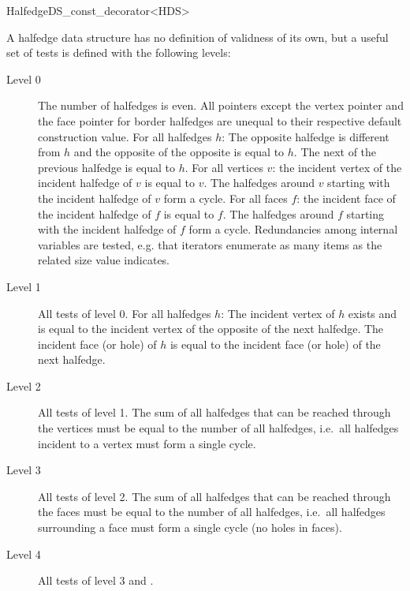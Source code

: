 \begin{ccRefClass}{HalfedgeDS_const_decorator<HDS>}

A halfedge data structure has no definition of validness of its own,
but a useful set of tests is defined with the following levels:
%
\begin{description}
\item[Level 0] 
  The number of halfedges is even. All pointers except
  the vertex pointer and the face pointer for border halfedges are
  unequal to their respective default construction value.  For all
  halfedges $h$: The opposite halfedge is different from $h$ and the
  opposite of the opposite is equal to $h$. The next of the previous
  halfedge is equal to $h$. For all vertices $v$: the incident vertex
  of the incident halfedge of $v$ is equal to $v$. The halfedges
  around $v$ starting with the incident halfedge of $v$ form a cycle.
  For all faces $f$: the incident face of the incident halfedge of $f$
  is equal to $f$. The halfedges around $f$ starting with the incident
  halfedge of $f$ form a cycle.  Redundancies among internal variables
  are tested, e.g. that iterators enumerate as many items as the
  related size value indicates.
\item[Level 1] 
  All tests of level 0. For all halfedges $h$: The
  incident vertex of $h$ exists and is equal to the incident vertex of
  the opposite of the next halfedge. The incident face (or hole) of
  $h$ is equal to the incident face (or hole) of the next halfedge.
\item[Level 2]
  All tests of level 1. The sum of all halfedges that can
  be reached through the vertices must be equal to the number of all
  halfedges, i.e.~all halfedges incident to a vertex must form a single
  cycle.
\item[Level 3]
  All tests of level 2. The sum of all halfedges that can
  be reached through the faces must be equal to the number of all
  halfedges, i.e.~all halfedges surrounding a face must form a single
  cycle (no holes in faces).
\item[Level 4]
  All tests of level 3 and .
\end{description}



\end{ccRefClass}
